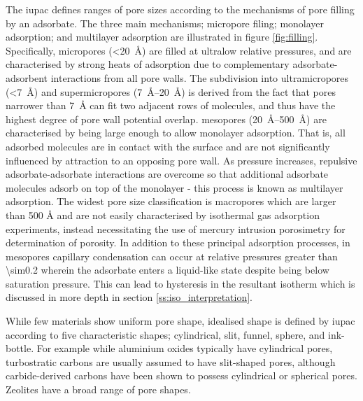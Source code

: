 The \acrfull{iupac} defines ranges of pore sizes according to the mechanisms of pore filling by an \gls{adsorbate}.\citep{Thommes2015Physisorption} The three main mechanisms; \gls{micropore} filing; monolayer adsorption; and multilayer adsorption are illustrated in figure \ref{fig:filling}. Specifically, \glspl{micropore} (\qty{<20}{\angstrom})\citep{mcnaught1997compendium} are filled at ultralow relative pressures, and are characterised by strong heats of adsorption due to complementary \gls{adsorbate}-\gls{adsorbent} interactions from all pore walls.\citep{dubinin1989fundamentals} The subdivision into \glspl{ultramicropore} (\qty{<7}{\angstrom}) and \glspl{supermicropore} (\qtyrange[range-units=single]{7}{20}{\angstrom})\citep{mcnaught1997compendium} is derived from the fact that pores narrower than \qty{7}{\angstrom} can fit two adjacent rows of  molecules,\citep{Thommes2015Physisorption} and thus have the highest degree of pore wall potential overlap. \Glspl{mesopore} (\qtyrange[range-units=single]{20}{500}{\angstrom})\citep{mcnaught1997compendium} are characterised by being large enough to allow monolayer adsorption. That is, all adsorbed molecules are in contact with the surface and are not significantly influenced by attraction to an opposing pore wall.\citep{gregg1967adsorption, yang1997gas} As pressure increases, repulsive \gls{adsorbate}-\gls{adsorbate} interactions are overcome so that additional \gls{adsorbate} molecules adsorb on top of the monolayer - this process is known as multilayer adsorption. The widest pore size classification is \glspl{macropore} which are larger than 500 \unit{\angstrom}\citep{mcnaught1997compendium} and are not easily characterised by isothermal gas adsorption experiments, instead necessitating the use of mercury intrusion porosimetry for determination of porosity.\citep{abell1999mercury, gregg1967adsorption, haynes1973pore} In addition to these principal adsorption processes, in \glspl{mesopore} capillary condensation can occur at relative pressures greater than \num{\sim0.2} wherein the adsorbate enters a liquid-like state despite being below saturation pressure. This can lead to hysteresis in the resultant isotherm which is discussed in more depth in section \ref{ss:iso_interpretation}.\citep{Thommes2015Physisorption, monson2012understanding}

While few materials show uniform pore shape, idealised shape is defined by \acrshort{iupac} according to five characteristic shapes; cylindrical, slit, funnel, sphere, and ink-bottle.\citep{rouquerol1994recommendations, kaneko1994determination, zdravkov2007pore} For example while aluminium oxides typically have cylindrical pores,\citep{zdravkov2007pore} \glspl{turbostratic carbon} are usually assumed to have slit-shaped pores,\citep{Everett1976Adsorption, Jagiello20132D, Lastoskie1993} although carbide-derived carbons have been shown to possess cylindrical or spherical pores.\citep{kurig2016suitability} Zeolites have a broad range of pore shapes.\citep{park2002effect} 

